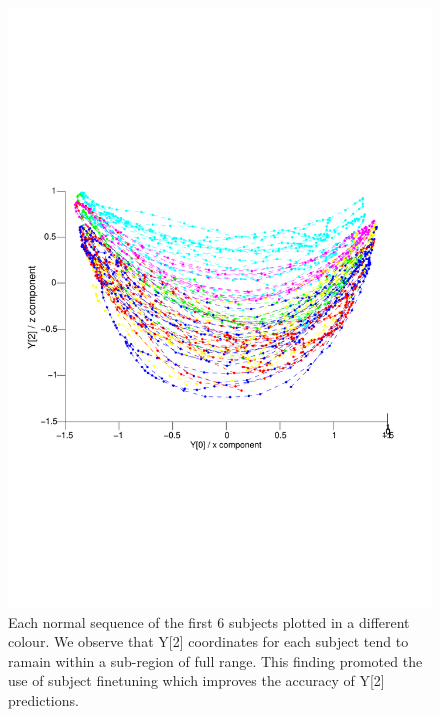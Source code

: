 \documentclass[11pt]{article} %
\begin{document}
\begin{figure}
\centering
\includegraphics*[trim={0 5cm 0 7cm},clip,width=0.75\linewidth,clip]{subjectsOnManifold.pdf} 
\caption{Each normal sequence of the first 6 subjects plotted in a different colour. We observe that Y[2] coordinates for each subject tend to ramain within a sub-region of full range. This finding promoted the use of subject finetuning which improves the accuracy of Y[2] predictions. }
\label{fig:subjectsOnManifold}
\end{figure}
\end{document}
